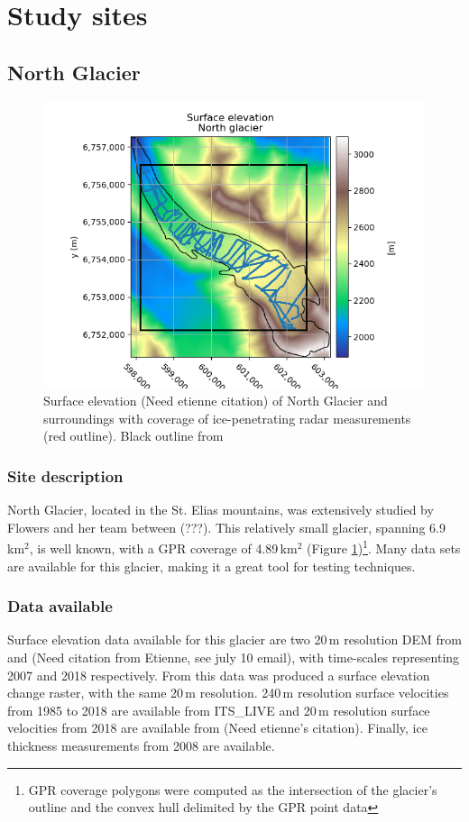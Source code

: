 \documentclass[a4, 12pt]{article}
\newcommand{\citeg}[1]{\citep[e.g.][]{#1}}
\begin{document}
\section{Study sites}

\subsection{North Glacier}

\begin{figure}[h!]
\centering
\includegraphics[scale=0.8]{../imgs/North glacier/elevation.png}
\caption{Surface elevation (Need etienne citation) of North Glacier and surroundings with coverage of ice-penetrating radar measurements (red outline). Black outline from \citet{pfeffer2014randolph}}
\label{fig:ng_dem}
\end{figure}
\subsubsection{Site description}

North Glacier, located in the St. Elias mountains, was extensively studied by Flowers and her team between (???). This relatively small glacier, spanning 6.9\,km$^2$, is well known, with a GPR coverage of 4.89\,km$^2$ (Figure \ref{fig:ng_dem})\footnote{GPR coverage polygons were computed as the intersection of the glacier's outline and the convex hull delimited by the GPR point data}. Many data sets are available for this glacier, making it a great tool for testing techniques.

\subsubsection{Data available}
Surface elevation data available for this glacier are two 20\,m resolution DEM from \citet{berthier2008spot5} and (Need citation from Etienne, see july 10 email), with time-scales representing 2007 and 2018 respectively. From this data was produced a surface elevation change raster, with the same 20\,m resolution. 240\,m resolution surface velocities from 1985 to 2018 are available from ITS\_LIVE \citeg{gardner2019its_live} and 20\,m resolution surface velocities from 2018 are available from (Need etienne's citation). Finally, ice thickness measurements from 2008 are available. 
\end{document}
